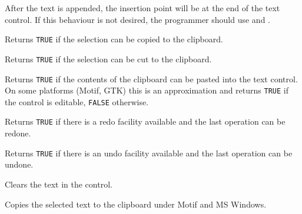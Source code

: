 After the text is appended, the insertion point will be at the end of the text control. If this behaviour is not desired,
the programmer should use  and .



\label{wxtextctrlcancopy}


Returns {\tt TRUE} if the selection can be copied to the clipboard.

\label{wxtextctrlcancut}


Returns {\tt TRUE} if the selection can be cut to the clipboard.

\label{wxtextctrlcanpaste}


Returns {\tt TRUE} if the contents of the clipboard can be pasted into the
text control. On some platforms (Motif, GTK) this is an approximation
and returns {\tt TRUE} if the control is editable, {\tt FALSE} otherwise.

\label{wxtextctrlcanredo}


Returns {\tt TRUE} if there is a redo facility available and the last operation
can be redone.

\label{wxtextctrlcanundo}


Returns {\tt TRUE} if there is an undo facility available and the last operation
can be undone.

\label{wxtextctrlclear}


Clears the text in the control.

\label{wxtextctrlcopy}


Copies the selected text to the clipboard under Motif and MS Windows.

